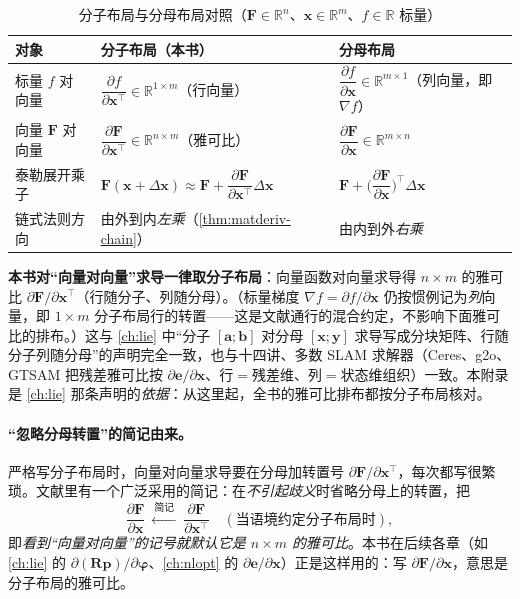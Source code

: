 \begin{table}[H]\centering\small
\caption{分子布局与分母布局对照（$\mathbf{F}\in\mathbb{R}^n$、$\mathbf{x}\in\mathbb{R}^m$、$f\in\mathbb{R}$ 标量）}
\label{app:matderiv-layout-table}
\begin{tabular}{lll}
\toprule
对象 & 分子布局（本书） & 分母布局 \\
\midrule
标量 $f$ 对向量 & $\dfrac{\partial f}{\partial\mathbf{x}^\top}\in\mathbb{R}^{1\times m}$（行向量） & $\dfrac{\partial f}{\partial\mathbf{x}}\in\mathbb{R}^{m\times 1}$（列向量，即 $\nabla f$）\\[1.6ex]
向量 $\mathbf{F}$ 对向量 & $\dfrac{\partial\mathbf{F}}{\partial\mathbf{x}^\top}\in\mathbb{R}^{n\times m}$（雅可比） & $\dfrac{\partial\mathbf{F}}{\partial\mathbf{x}}\in\mathbb{R}^{m\times n}$ \\[1.6ex]
泰勒展开乘子 & $\mathbf{F}(\mathbf{x}{+}\Delta\mathbf{x})\approx\mathbf{F}{+}\dfrac{\partial\mathbf{F}}{\partial\mathbf{x}^\top}\Delta\mathbf{x}$ & $\mathbf{F}{+}\Big(\dfrac{\partial\mathbf{F}}{\partial\mathbf{x}}\Big)^{\!\top}\Delta\mathbf{x}$ \\[1.6ex]
链式法则方向 & 由外到内\emph{左乘}（\cref{thm:matderiv-chain}） & 由内到外\emph{右乘} \\
\bottomrule
\end{tabular}
\end{table}

\begin{insight}[本书的统一约定]
\textbf{本书对“向量对向量”求导一律取分子布局}：向量函数对向量求导得 $n\times m$ 的雅可比 $\partial\mathbf{F}/\partial\mathbf{x}^\top$（行随分子、列随分母）。（标量梯度 $\nabla f=\partial f/\partial\mathbf{x}$ 仍按惯例记为\emph{列}向量，即 $1\times m$ 分子布局行的转置——这是文献通行的混合约定，不影响下面雅可比的排布。）这与 \cref{ch:lie} 中“分子 $[\mathbf{a};\mathbf{b}]$ 对分母 $[\mathbf{x};\mathbf{y}]$ 求导写成分块矩阵、行随分子列随分母”的声明完全一致，也与十四讲\cite{gaoxiang2019slam14}、多数 SLAM 求解器（Ceres、g2o、GTSAM 把残差雅可比按 $\partial\mathbf{e}/\partial\mathbf{x}$、行$=$残差维、列$=$状态维组织）一致。本附录是 \cref{ch:lie} 那条声明的\emph{依据}：从这里起，全书的雅可比排布都按分子布局核对。
\end{insight}

\paragraph{“忽略分母转置”的简记由来。}
严格写分子布局时，向量对向量求导要在分母加转置号 $\partial\mathbf{F}/\partial\mathbf{x}^\top$，每次都写很繁琐。文献里有一个广泛采用的简记\cite{gaoxiang2019slam14}：在\emph{不引起歧义}时省略分母上的转置，把
\begin{equation}
  \frac{\partial\mathbf{F}}{\partial\mathbf{x}}\ \xleftarrow{\ \text{简记}\ }\ \frac{\partial\mathbf{F}}{\partial\mathbf{x}^\top}
  \quad(\text{当语境约定分子布局时}),
  \label{eq:matderiv-shorthand}
\end{equation}
即\emph{看到“向量对向量”的记号就默认它是 $n\times m$ 的雅可比}。本书在后续各章（如 \cref{ch:lie} 的 $\partial(\mathbf{R}\mathbf{p})/\partial\boldsymbol{\varphi}$、\cref{ch:nlopt} 的 $\partial\mathbf{e}/\partial\mathbf{x}$）正是这样用的：写 $\partial\mathbf{F}/\partial\mathbf{x}$，意思是分子布局的雅可比。

